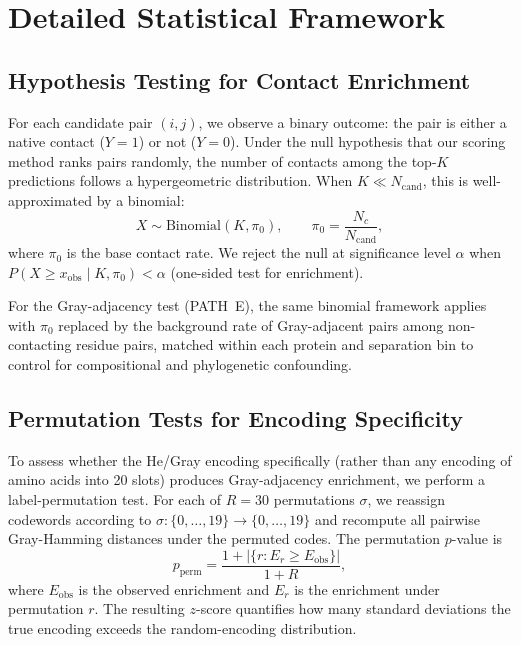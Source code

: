 \section{Detailed Statistical Framework}
\label{sec:statistical-framework}

\subsection{Hypothesis Testing for Contact Enrichment}

For each candidate pair $(i,j)$, we observe a binary outcome: the pair is
either a native contact ($Y = 1$) or not ($Y = 0$).  Under the null
hypothesis that our scoring method ranks pairs randomly, the number of
contacts among the top-$K$ predictions follows a hypergeometric distribution.
When $K \ll N_{\mathrm{cand}}$, this is well-approximated by a binomial:
\begin{equation}
	X \sim \mathrm{Binomial}(K, \pi_0), \qquad
	\pi_0 = \frac{N_c}{N_{\mathrm{cand}}},
\end{equation}
where $\pi_0$ is the base contact rate.  We reject the null at significance
level $\alpha$ when $P(X \geq x_{\mathrm{obs}} \mid K, \pi_0) < \alpha$
(one-sided test for enrichment).

For the Gray-adjacency test (PATH~E), the same binomial framework applies
with $\pi_0$ replaced by the background rate of Gray-adjacent pairs among
non-contacting residue pairs, matched within each protein and separation bin
to control for compositional and phylogenetic confounding.

\subsection{Permutation Tests for Encoding Specificity}

To assess whether the He/Gray encoding specifically (rather than any encoding
of amino acids into 20 slots) produces Gray-adjacency enrichment, we perform
a label-permutation test.  For each of $R = 30$ permutations $\sigma$, we
reassign codewords according to $\sigma: \{0,\ldots,19\} \to \{0,\ldots,19\}$
and recompute all pairwise Gray-Hamming distances under the permuted codes.
The permutation $p$-value is
\begin{equation}
	p_\mathrm{perm} =
	\frac{1 + |\{r : E_r \geq E_\mathrm{obs}\}|}{1 + R},
\end{equation}
where $E_\mathrm{obs}$ is the observed enrichment and $E_r$ is the enrichment
under permutation $r$.  The resulting $z$-score quantifies how many standard
deviations the true encoding exceeds the random-encoding distribution.

